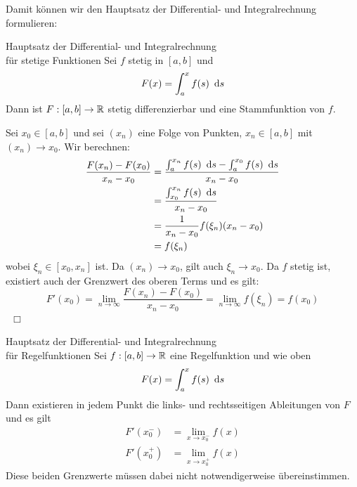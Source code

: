 \par
Damit können wir den Hauptsatz der Differential- und Integralrechnung formulieren:
\begin{satz}{Hauptsatz der Differential- und Integralrechnung\\für stetige Funktionen}
	Sei $f$ stetig in $[a,b]$ und
	\begin{equation*}
		F(x)=\int_a^x f(s)\ \operatorname{d}\! s
	\end{equation*}
	Dann ist $F:[a,b]\rightarrow \mathbb{R}$ stetig differenzierbar und eine Stammfunktion von $f$.
\end{satz}
\begin{beweis}
	Sei $x_0\in[a,b]$ und sei $(x_n)$ eine Folge von Punkten, $x_n\in[a,b]$ mit $(x_n)\to x_0$. Wir berechnen:
	\begin{align*}
		\frac{F(x_n)-F(x_0)}{x_n-x_0}&=\frac{\int_a^{x_n} f(s)\ \operatorname{d}\! s-\int_a^{x_0} f(s)\ \operatorname{d}\! s}{x_n-x_0}\\
		&=\frac{\int_{x_0}^{x_n} f(s)\ \operatorname{d}\! s}{x_n-x_0}\\
		&=\frac{1}{x_n-x_0}f(\xi_n)(x_n-x_0)\\
		&=f(\xi_n)
	\end{align*}
	wobei $\xi_n\in[x_0,x_n]$ ist.
	Da $(x_n)\to x_0$, gilt auch $\xi_n\to x_0$. Da $f$ stetig ist, existiert auch der Grenzwert des oberen Terms und es gilt:
	\begin{equation*}
		F'(x_0)=\lim\limits_{n\to\infty}\frac{F(x_n)-F(x_0)}{x_n-x_0}=\lim\limits_{n\to\infty}f(\xi_n)=f(x_0)
	\end{equation*}
	\ \hfill$\Box$
\end{beweis}

\begin{satz}{Hauptsatz der Differential- und Integralrechnung\\für Regelfunktionen}
	Sei $f:[a,b]\rightarrow\mathbb{R}$ eine Regelfunktion und wie oben
	\begin{equation*}
		F(x)=\int_a^x f(s)\ \operatorname{d}\! s
	\end{equation*}
	Dann existieren in jedem Punkt die links- und rechtsseitigen Ableitungen von $F$ und es gilt
	\begin{align*}
		F'(x_0^-)&=\lim\limits_{x\to x_0^-}f(x)\\
		F'(x_0^+)&=\lim\limits_{x\to x_0^+}f(x)
	\end{align*}
	Diese beiden Grenzwerte müssen dabei nicht notwendigerweise übereinstimmen.
\end{satz}

